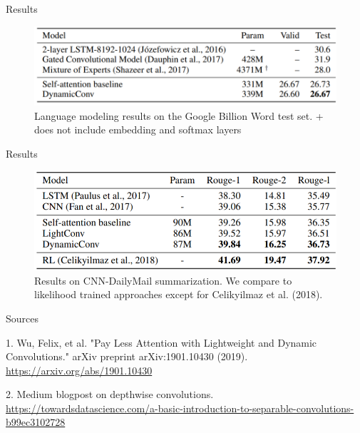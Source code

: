 \documentclass{beamer}
\begin{document}
\begin{frame}{Results}

\begin{figure}[h]
\includegraphics[width=1.0\textwidth]{img/results4}
\caption{Language modeling results on the Google Billion Word test set. + does not include embedding and softmax layers}
\end{figure}
\end{frame}
\begin{frame}{Results}

\begin{figure}[h]
\includegraphics[width=1.0\textwidth]{img/results5}
\caption{Results on CNN-DailyMail summarization. We compare to likelihood trained approaches
except for Celikyilmaz et al. (2018).}
\end{figure}
\end{frame}

\begin{frame}{Sources}

\begin{thebibliography}{0}

   1. Wu, Felix, et al. "Pay Less Attention with Lightweight and Dynamic Convolutions." arXiv preprint arXiv:1901.10430 (2019). \url{https://arxiv.org/abs/1901.10430} 
  
   2. Medium blogpost on depthwise convolutions. \url{https://towardsdatascience.com/a-basic-introduction-to-separable-convolutions-b99ec3102728}
  
\end{thebibliography}

\end{frame}

 
 
 
\end{document}
